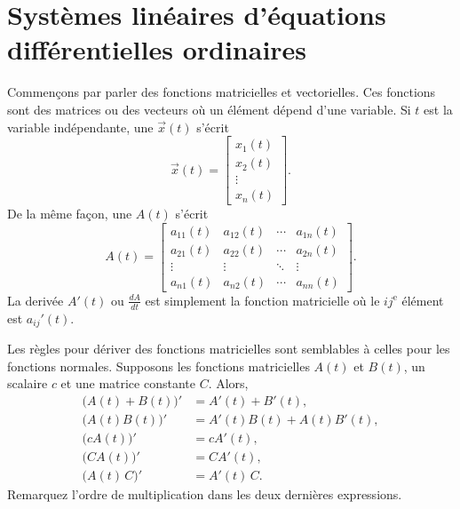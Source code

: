 
\sectionnewpage
\section{Systèmes linéaires d'équations différentielles ordinaires}
\label{linsystems:section}


Commençons par parler des fonctions matricielles et vectorielles. Ces fonctions sont des matrices ou des vecteurs où un élément dépend d'une variable. Si $t$ est la variable indépendante, une
\emph{}
$\vec{x}(t)$ s'écrit
\begin{equation*}
\vec{x}(t) = \begin{bmatrix}
x_1(t) \\
x_2(t) \\
\vdots \\
x_n(t)
\end{bmatrix} .
\end{equation*}
De la même façon, une \emph{} $A(t)$ s'écrit
\begin{equation*}
A(t) =
\begin{bmatrix}
a_{11}(t) & a_{12}(t) & \cdots & a_{1n}(t) \\
a_{21}(t) & a_{22}(t) & \cdots & a_{2n}(t) \\
\vdots & \vdots & \ddots & \vdots \\
a_{n1}(t) & a_{n2}(t) & \cdots & a_{nn}(t)
\end{bmatrix} .
\end{equation*}
La derivée $A'(t)$ ou $\frac{dA}{dt}$ est simplement la fonction matricielle où le $ij^{\text{e}}$ élément est $a_{ij}'(t)$.

Les règles pour dériver des fonctions matricielles sont semblables à celles pour les fonctions normales. Supposons les fonctions matricielles $A(t)$ et $B(t)$, un scalaire $c$ et une matrice constante $C$.
Alors,
\begin{align*}
\bigl(A(t)+B(t)\bigr)' & = A'(t) + B'(t), \\
\bigl(A(t)B(t)\bigr)' & = A'(t)B(t) + A(t)B'(t), \\
\bigl(cA(t)\bigr)' & = cA'(t), \\
\bigl(CA(t)\bigr)' & = CA'(t), \\
\bigl(A(t)\,C\bigr)' & = A'(t)\,C .
\end{align*}
Remarquez l’ordre de multiplication dans les deux dernières expressions.

